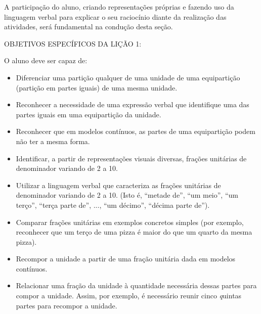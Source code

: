 A participação do aluno, criando representações próprias e fazendo uso da linguagem verbal para explicar o seu raciocínio diante da realização das atividades, será fundamental na condução desta seção.
\vspace{.15cm}

\noindent OBJETIVOS ESPECÍFICOS DA LIÇÃO 1:
\vspace{.15cm}

\noindent O aluno deve ser capaz de:
\begin{itemize}
\item  Diferenciar uma partição qualquer de uma unidade de uma equipartição (partição em partes iguais) de uma mesma unidade.
\item Reconhecer a necessidade de uma expressão verbal que identifique uma das partes iguais em uma equipartição da unidade.
\item  Reconhecer que em modelos contínuos, as partes de uma equipartição podem não ter a mesma forma.
\item  Identificar, a partir de representações visuais diversas, frações unitárias de denominador variando de 2 a 10.
\item  Utilizar a linguagem verbal que caracteriza as frações unitárias de denominador variando de 2 a 10. (Isto é, ``metade de'', ``um meio'', ``um terço'', ``terça parte de'', ..., ``um décimo'', ``décima parte de'').
\item  Comparar frações unitárias em exemplos concretos simples (por exemplo, reconhecer que um terço de uma pizza é maior do que um quarto da mesma pizza).
\item  Recompor a unidade a partir de uma fração unitária dada em modelos contínuos.
\item  Relacionar uma fração da unidade à quantidade necessária dessas partes para compor a unidade. Assim, por exemplo, é necessário reunir cinco {\textit quintas partes} para recompor a unidade.
\end{itemize}

